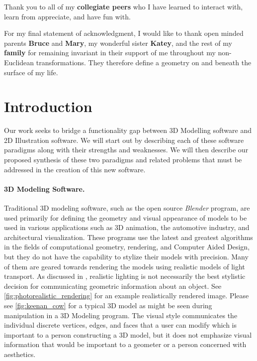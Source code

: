 \documentclass[12pt, letterpaper]{article}
\begin{document}
Thank you to all of my \textbf{collegiate peers} who I have learned to interact with, learn from appreciate, and have fun with.

For my final statement of acknowledgment, I would like to thank open minded parents \textbf{Bruce} and \textbf{Mary},
my wonderful sister \textbf{Katey}, and the rest of my \textbf{family} for remaining
invariant in their support of me throughout my non-Euclidean transformations. They therefore define a geometry on and beneath the surface of my life.


\newpage
\doublespacing
\tableofcontents
\newpage

\setcounter{page}{1}


\section{Introduction}

	Our work seeks to bridge a functionality gap between 3D Modelling software and 2D Illustration software. We will start out by describing each of these
	software paradigms along with their strengths and weaknesses. We will then describe our proposed synthesis of these two paradigms and related problems
	that must be addressed in the creation of this new software.


	\paragraph{3D Modeling Software.}

	Traditional 3D modeling software, such as the open source \emph{Blender} program, are used primarily for defining the geometry and visual appearance of models to be 
	used in various applications such as 3D animation, the automotive industry, and architectural visualization.
	These programs use the latest and greatest algorithms in the fields of computational geometry, rendering, and Computer Aided Design,
	but they do not have the capability to stylize their models with precision. Many of them are geared towards rendering the models using 
	realistic models of light transport. As discussed in \cite{JDA08}, realistic lighting is not necessarily the best stylistic decision for communicating
	geometric information about an object. See \ref{fig:photorealistic_rendering} for an example realistically rendered image.
	Please see \ref{fig:keenan_cow} for a typical 3D model as might be seen during manipulation in a 3D Modeling program. The visual style communicates
	the individual discrete vertices, edges, and faces that a user can modify which is important to a person constructing a 3D model, but it does not
	emphasize visual information that would be important to a geometer or a person concerned with aesthetics.
\end{document}
